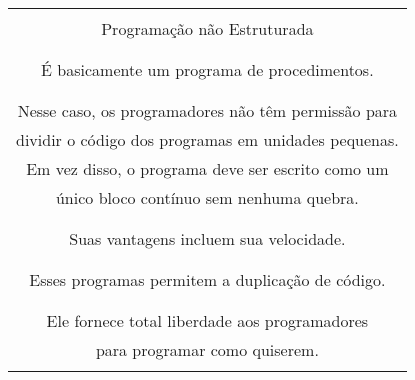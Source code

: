 \documentclass[12pt,a4paper]{abntex2}
\begin{document}
\begin{table}%
    \begin{tabular}{|c|} \hline \\
    Programação não Estruturada \\\\ \hline \\
    É basicamente um programa de procedimentos. \\ \\\hdashline \\
    Nesse caso, os programadores não têm permissão para\\
    dividir o código dos programas em unidades pequenas.\\
    Em vez disso, o programa deve ser escrito como um\\
    único bloco contínuo sem nenhuma quebra. \\ \\\hdashline \\
    Suas vantagens incluem sua velocidade. \\ \\\hdashline \\
    Esses programas permitem a duplicação de código.  \\ \\\hdashline \\
    Ele fornece total liberdade aos programadores \\
    para programar como quiserem. \\ \\\hline

    \end{tabular}
\end{table}
\end{document}
